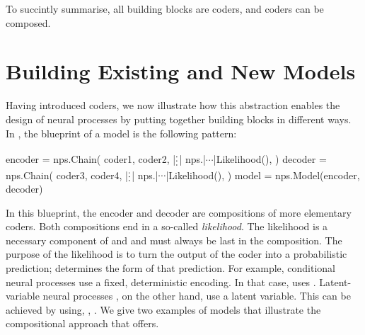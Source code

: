 \documentclass[12pt, twoside]{report}
\begin{document}
To succintly summarise, all building blocks are coders, and coders can be composed.

\section{Building Existing and New Models}
\label{sec:software:examples}

Having introduced coders, we now illustrate how this abstraction enables the design of neural processes by putting together building blocks in different ways.
In ,
the blueprint of a model is the following pattern:
\begin{pythoncode}{\small}{}
encoder = nps.Chain(
   coder1,
   coder2,
   |$\raisebox{-3pt}{\vdots}$|
   nps.|$\cdots$|Likelihood(),
)
decoder = nps.Chain(
   coder3,
   coder4,
   |$\raisebox{-3pt}{\vdots}$|
   nps.|$\cdots$|Likelihood(),
)
model = nps.Model(encoder, decoder)
\end{pythoncode}
In this blueprint, the encoder and decoder are compositions of more elementary coders.
Both compositions end in a so-called \emph{likelihood}.
The likelihood is a necessary component of  and 
and must always be last in the composition.
The purpose of the likelihood is to turn the output of the coder into a probabilistic prediction;
 determines the form of that prediction.
For example, conditional neural processes \parencite[CNPs;][]{Garnelo:2018:Conditional_Neural_Processes} use a fixed, deterministic encoding.
In that case,  uses .
Latent-variable neural processes \parencite[LNPs;][]{Garnelo:2018:Neural_Processes},
on the other hand, use a latent variable.
This can be achieved by using, \eg, .
We give two examples of models that illustrate the compositional approach that  offers.
\end{document}
